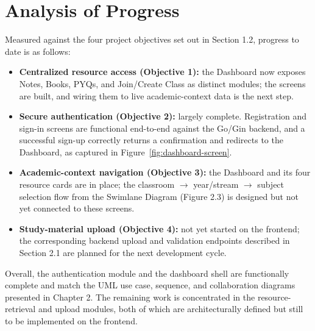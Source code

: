 \section{Analysis of Progress}

Measured against the four project objectives set out in Section 1.2, progress to
date is as follows:

\begin{itemize}
    \item \textbf{Centralized resource access (Objective 1):} the Dashboard now
    exposes Notes, Books, PYQs, and Join/Create Class as distinct modules; the
    screens are built, and wiring them to live academic-context data is the next
    step.

    \item \textbf{Secure authentication (Objective 2):} largely complete.
    Registration and sign-in screens are functional end-to-end against the
    Go/Gin backend, and a successful sign-up correctly returns a confirmation
    and redirects to the Dashboard, as captured in Figure~\ref{fig:dashboard-screen}.

    \item \textbf{Academic-context navigation (Objective 3):} the Dashboard and
    its four resource cards are in place; the classroom $\rightarrow$
    year/stream $\rightarrow$ subject selection flow from the Swimlane Diagram
    (Figure 2.3) is designed but not yet connected to these screens.

    \item \textbf{Study-material upload (Objective 4):} not yet started on the
    frontend; the corresponding backend upload and validation endpoints
    described in Section 2.1 are planned for the next development cycle.
\end{itemize}

Overall, the authentication module and the dashboard shell are functionally
complete and match the UML use case, sequence, and collaboration diagrams
presented in Chapter 2. The remaining work is concentrated in the
resource-retrieval and upload modules, both of which are architecturally
defined but still to be implemented on the frontend.
